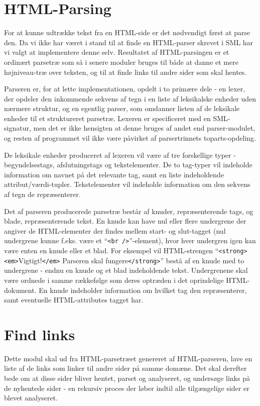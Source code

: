 \documentclass[a4paper,oneside,article, titlepage]{memoir}
\begin{document}
\section{HTML-Parsing}
For at kunne udtrække tekst fra en HTML-side er det nødvendigt først
at parse den. Da vi ikke har været i stand til at finde en HTML-parser
skrevet i SML har vi valgt at implementere denne selv. Resultatet af
HTML-parsingen er et ordinært parsetræ som så i senere moduler bruges
til både at danne et mere højniveau-træ over teksten, og til at finde
links til andre sider som skal hentes.

Parseren er, for at lette implementationen, opdelt i to primære dele -
en lexer, der opdeler den inkommende sekvens af tegn i en liste af
leksikalske enheder uden nærmere struktur, og en egentlig parser, som
omdanner listen af de leksikale enheder til et struktureret
parsetræ. Lexeren er specificeret med en SML-signatur, men det er ikke
hensigten at denne bruges af andet end parser-modulet, og resten af
programmet vil ikke være påvirket af parsertrinnets toparts-opdeling.

De leksikale enheder produceret af lexeren vil være af tre forskellige
typer - begyndelsestags, afslutningstags og tekstelementer. De to
tag-typer vil indeholde information om navnet på det relevante tag,
samt en liste indeholdende attribut/værdi-tupler. Tekstelementer vil
indeholde information om den sekvens af tegn de repræsenterer.

Det af parseren producerede parsetræ består af knuder, repræsenterende
tags, og blade, repræsenterende tekst. En knude kan have nul eller
flere undergrene der angiver de HTML-elementer der findes mellem
start- og slut-tagget (nul undergrene kunne f.eks. være et
``\texttt{<br />}''-element), hvor hver undergren igen kan være enten
en knude eller et blad. For eksempel vil HTML-strengen
``\texttt{<strong>}\texttt{<em>}Vigtigt!\texttt{</em>} Parseren skal
fungere\texttt{</strong>}'' bestå af en knude med to undergrene -
endnu en knude og et blad indeholdende tekst. Undergrenene skal være
ordnede i samme rækkefølge som deres optræden i det oprindelige
HTML-dokument. En knude indeholder information om hvilket tag den
repræsenterer, samt eventuelle HTML-attributes tagget har.

\section{Find links}
Dette modul skal ud fra HTML-parsetræet genereret af HTML-parseren,
lave en liste af de links som linker til andre sider på samme domæne.
Det skal derefter bede om at disse sider bliver hentet, parset og
analyseret, og undersøge links på de nyhentede sider - en rekursiv
proces der løber indtil alle tilgængelige sider er blevet analyseret.
\end{document}
